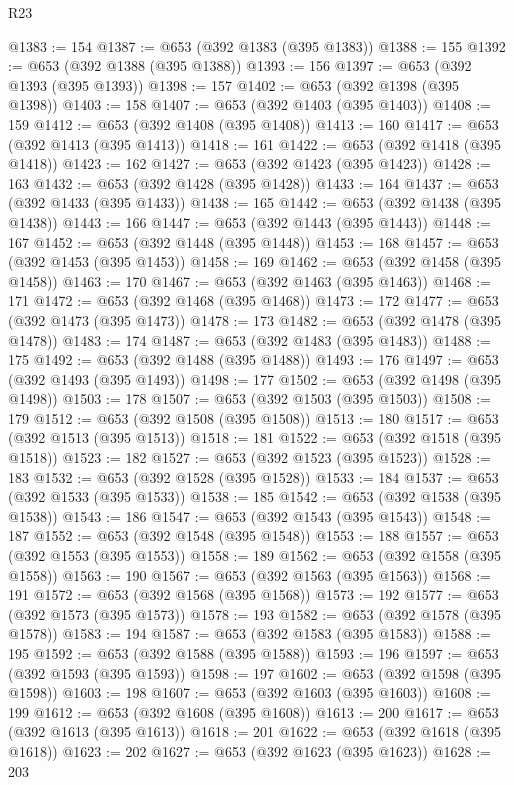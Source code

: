 \begin{lexlean}{R23}
\begin{coremodule}
@1383 := 154
@1387 := @653 (@392 @1383 (@395 @1383))
@1388 := 155
@1392 := @653 (@392 @1388 (@395 @1388))
@1393 := 156
@1397 := @653 (@392 @1393 (@395 @1393))
@1398 := 157
@1402 := @653 (@392 @1398 (@395 @1398))
@1403 := 158
@1407 := @653 (@392 @1403 (@395 @1403))
@1408 := 159
@1412 := @653 (@392 @1408 (@395 @1408))
@1413 := 160
@1417 := @653 (@392 @1413 (@395 @1413))
@1418 := 161
@1422 := @653 (@392 @1418 (@395 @1418))
@1423 := 162
@1427 := @653 (@392 @1423 (@395 @1423))
@1428 := 163
@1432 := @653 (@392 @1428 (@395 @1428))
@1433 := 164
@1437 := @653 (@392 @1433 (@395 @1433))
@1438 := 165
@1442 := @653 (@392 @1438 (@395 @1438))
@1443 := 166
@1447 := @653 (@392 @1443 (@395 @1443))
@1448 := 167
@1452 := @653 (@392 @1448 (@395 @1448))
@1453 := 168
@1457 := @653 (@392 @1453 (@395 @1453))
@1458 := 169
@1462 := @653 (@392 @1458 (@395 @1458))
@1463 := 170
@1467 := @653 (@392 @1463 (@395 @1463))
@1468 := 171
@1472 := @653 (@392 @1468 (@395 @1468))
@1473 := 172
@1477 := @653 (@392 @1473 (@395 @1473))
@1478 := 173
@1482 := @653 (@392 @1478 (@395 @1478))
@1483 := 174
@1487 := @653 (@392 @1483 (@395 @1483))
@1488 := 175
@1492 := @653 (@392 @1488 (@395 @1488))
@1493 := 176
@1497 := @653 (@392 @1493 (@395 @1493))
@1498 := 177
@1502 := @653 (@392 @1498 (@395 @1498))
@1503 := 178
@1507 := @653 (@392 @1503 (@395 @1503))
@1508 := 179
@1512 := @653 (@392 @1508 (@395 @1508))
@1513 := 180
@1517 := @653 (@392 @1513 (@395 @1513))
@1518 := 181
@1522 := @653 (@392 @1518 (@395 @1518))
@1523 := 182
@1527 := @653 (@392 @1523 (@395 @1523))
@1528 := 183
@1532 := @653 (@392 @1528 (@395 @1528))
@1533 := 184
@1537 := @653 (@392 @1533 (@395 @1533))
@1538 := 185
@1542 := @653 (@392 @1538 (@395 @1538))
@1543 := 186
@1547 := @653 (@392 @1543 (@395 @1543))
@1548 := 187
@1552 := @653 (@392 @1548 (@395 @1548))
@1553 := 188
@1557 := @653 (@392 @1553 (@395 @1553))
@1558 := 189
@1562 := @653 (@392 @1558 (@395 @1558))
@1563 := 190
@1567 := @653 (@392 @1563 (@395 @1563))
@1568 := 191
@1572 := @653 (@392 @1568 (@395 @1568))
@1573 := 192
@1577 := @653 (@392 @1573 (@395 @1573))
@1578 := 193
@1582 := @653 (@392 @1578 (@395 @1578))
@1583 := 194
@1587 := @653 (@392 @1583 (@395 @1583))
@1588 := 195
@1592 := @653 (@392 @1588 (@395 @1588))
@1593 := 196
@1597 := @653 (@392 @1593 (@395 @1593))
@1598 := 197
@1602 := @653 (@392 @1598 (@395 @1598))
@1603 := 198
@1607 := @653 (@392 @1603 (@395 @1603))
@1608 := 199
@1612 := @653 (@392 @1608 (@395 @1608))
@1613 := 200
@1617 := @653 (@392 @1613 (@395 @1613))
@1618 := 201
@1622 := @653 (@392 @1618 (@395 @1618))
@1623 := 202
@1627 := @653 (@392 @1623 (@395 @1623))
@1628 := 203

\end{coremodule}
\end{lexlean}
